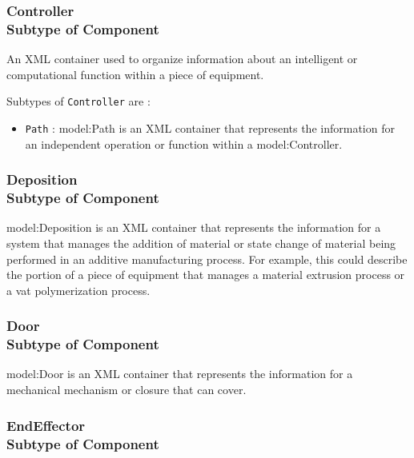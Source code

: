 \FloatBarrier
\subsubsection[Controller]{Controller \\ {\small Subtype of Component}}
  \label{type:Controller}

\FloatBarrier

An XML container used to organize information about an intelligent or computational function within a piece of equipment.

Subtypes of \texttt{Controller} are :

\begin{itemize}
\item \texttt{Path} : {model:Path} is an XML container that represents the information for an independent operation or function within a {model:Controller}.

\end{itemize}

\FloatBarrier
\subsubsection[Deposition]{Deposition \\ {\small Subtype of Component}}
  \label{type:Deposition}

\FloatBarrier

{model:Deposition} is an XML container that represents the information for a system that manages the addition of material or state change of material being performed in an additive manufacturing process.  For example, this could describe the portion of a piece of equipment that manages a material extrusion process or a vat polymerization process.

\FloatBarrier
\subsubsection[Door]{Door \\ {\small Subtype of Component}}
  \label{type:Door}

\FloatBarrier

{model:Door} is an XML container that represents the information for a mechanical mechanism or closure that can cover.

\FloatBarrier
\subsubsection[EndEffector]{EndEffector \\ {\small Subtype of Component}}
  \label{type:EndEffector}

